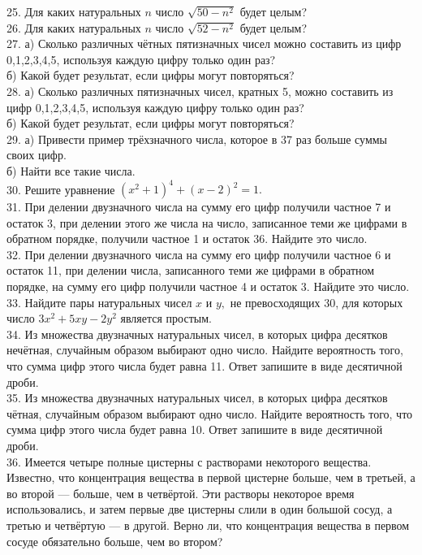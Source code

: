\documentclass[12pt]{article}
\begin{document}
25. Для каких натуральных $n$ число $\sqrt{50-n^2}$ будет целым?\\
26. Для каких натуральных $n$ число $\sqrt{52-n^2}$ будет целым?\\
27. а) Сколько различных чётных пятизначных чисел можно составить из цифр 0,1,2,3,4,5, используя каждую цифру только один раз?\\
б) Какой будет результат, если цифры могут повторяться?\\
28. а) Сколько различных пятизначных чисел, кратных 5, можно составить из цифр 0,1,2,3,4,5, используя каждую цифру только один раз?\\
б) Какой будет результат, если цифры могут повторяться?\\
29. а) Привести пример трёхзначного числа, которое в 37 раз больше суммы своих цифр.\\
б) Найти все такие числа.\\
30. Решите уравнение $(x^2+1)^4+(x-2)^2=1.$\\
31. При делении двузначного числа на сумму его цифр получили частное 7 и остаток 3, при делении этого же числа на число, записанное теми же цифрами в обратном порядке, получили частное 1 и остаток 36. Найдите это число.\\
32. При делении двузначного числа на сумму его цифр получили частное 6 и остаток 11, при делении числа, записанного теми же цифрами в обратном порядке, на сумму его цифр получили частное 4 и остаток 3. Найдите это число.\\
33. Найдите пары натуральных чисел $x$ и $y,$ не превосходящих 30, для которых число $3x^2+5xy-2y^2$ является простым.\\
34. Из множества двузначных натуральных чисел, в которых цифра десятков нечётная, случайным образом выбирают одно число. Найдите вероятность того, что сумма цифр этого числа будет равна 11. Ответ запишите в виде десятичной дроби.\\
35. Из множества двузначных натуральных чисел, в которых цифра десятков чётная, случайным образом выбирают одно число. Найдите вероятность того, что сумма цифр этого числа будет равна 10. Ответ запишите в виде десятичной дроби.\\
36. Имеется четыре полные цистерны с растворами некоторого вещества. Известно, что концентрация вещества в первой цистерне больше, чем в третьей, а во второй --- больше, чем в четвёртой. Эти растворы некоторое время использовались, и затем первые две цистерны слили в один большой сосуд, а третью и четвёртую --- в другой. Верно ли, что концентрация вещества в первом сосуде обязательно больше, чем во втором?\\
\end{document}

